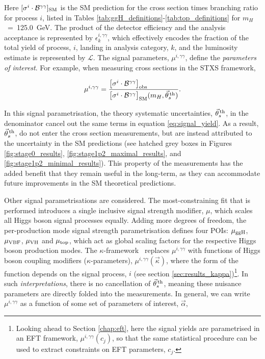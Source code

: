 \noindent
Here $[\sigma^i \cdot \mathcal{B}^{\gamma\gamma}]_{\rm{SM}}$ is the SM prediction for the cross section times branching ratio for process $i$, listed in Tables \ref{tab:ggH_definitions}-\ref{tab:top_definitions} for $m_H$~=~125.0~GeV. The product of the detector efficiency and the analysis acceptance is represented by $\epsilon^{i,\gamma\gamma}_k$, which effectively encodes the fraction of the total yield of process, $i$, landing in analysis category, $k$, and the luminosity estimate is represented by $\mathcal{L}$. The signal parameters, $\mu^{i,\gamma\gamma}$, define the \textit{parameters of interest}. For example, when measuring cross sections in the STXS framework,

\begin{equation}\label{eq:mu_stxs}
    \mu^{i,\gamma\gamma} = \frac{\big[\sigma^i \cdot \mathcal{B}^{\gamma\gamma} \big]_{\rm{obs}}\hfill}{\big[\sigma^i \cdot \mathcal{B}^{\gamma\gamma} \big]_{\rm{SM}}(m_H,\vec{\theta}^{\,\rm{th}}_{s})}.
\end{equation}

\noindent
In this signal parametrisation, the theory systematic uncertainties, $\vec{\theta}^{\,\rm{th}}_{s}$, in the denominator cancel out the same terms in equation \ref{eq:signal_yield}. As a result, $\vec{\theta}^{\,\rm{th}}_{s}$, do not enter the cross section measurements, but are instead attributed to the uncertainty in the SM predictions (see hatched grey boxes in Figures \ref{fig:stage0_results}, \ref{fig:stage1p2_maximal_results}, and \ref{fig:stage1p2_minimal_results}). This property of the measurements has the added benefit that they remain useful in the long-term, as they can accommodate future improvements in the SM theoretical predictions.

Other signal parametrisations are considered. The most-constraining fit that is performed introduces a single inclusive signal strength modifier, $\mu$, which scales all Higgs boson signal processes equally. Adding more degrees of freedom, the per-production mode signal strength parametrisation defines four POIs: $\mu_{\rm{ggH}}$, $\mu_{\rm{VBF}}$, $\mu_{\rm{VH}}$ and $\mu_{\rm{top}}$, which act as global scaling factors for the respective Higgs boson production modes. The $\kappa$-framework~\cite{Heinemeyer:2013tqa} replaces $\mu^{i,\gamma\gamma}$ with functions of Higgs boson coupling modifiers ($\kappa$-parameters), $\mu^{i,\gamma\gamma}(\vec{\kappa})$, where the form of the function depends on the signal process, $i$ (see section \ref{sec:results_kappa})\footnote{Looking ahead to Section \ref{chap:eft}, here the signal yields are parametrised in an EFT framework, $\mu^{i,\gamma\gamma}(c_j)$, so that the same statistical procedure can be used to extract constraints on EFT parameters, $c_j$.}. In such \textit{interpretations}, there is no cancellation of $\vec{\theta}^{\,\rm{th}}_{s}$, meaning these nuisance parameters are directly folded into the measurements. In general, we can write $\mu^{i,\gamma\gamma}$ as a function of some set of parameters of interest, $\vec{\alpha}$,

